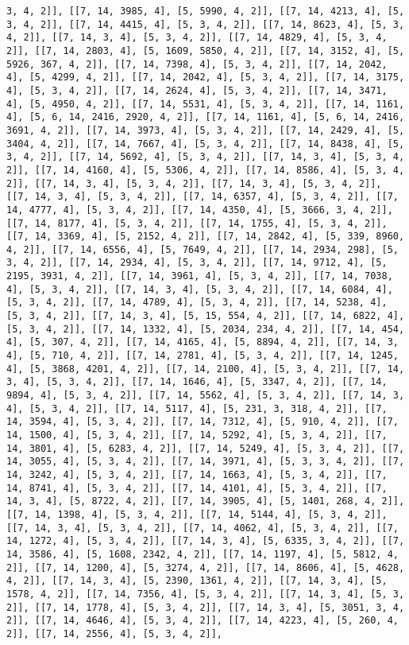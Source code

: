 \documentclass[12pt,fleqn]{article}\usepackage{../../common}
\begin{document}
\begin{verbatim}
3, 4, 2]], [[7, 14, 3985, 4], [5, 5990, 4, 2]], [[7, 14, 4213, 4], [5, 3, 4, 2]], [[7, 14, 4415, 4], [5, 3, 4, 2]], [[7, 14, 8623, 4], [5, 3, 4, 2]], [[7, 14, 3, 4], [5, 3, 4, 2]], [[7, 14, 4829, 4], [5, 3, 4, 2]], [[7, 14, 2803, 4], [5, 1609, 5850, 4, 2]], [[7, 14, 3152, 4], [5, 5926, 367, 4, 2]], [[7, 14, 7398, 4], [5, 3, 4, 2]], [[7, 14, 2042, 4], [5, 4299, 4, 2]], [[7, 14, 2042, 4], [5, 3, 4, 2]], [[7, 14, 3175, 4], [5, 3, 4, 2]], [[7, 14, 2624, 4], [5, 3, 4, 2]], [[7, 14, 3471, 4], [5, 4950, 4, 2]], [[7, 14, 5531, 4], [5, 3, 4, 2]], [[7, 14, 1161, 4], [5, 6, 14, 2416, 2920, 4, 2]], [[7, 14, 1161, 4], [5, 6, 14, 2416, 3691, 4, 2]], [[7, 14, 3973, 4], [5, 3, 4, 2]], [[7, 14, 2429, 4], [5, 3404, 4, 2]], [[7, 14, 7667, 4], [5, 3, 4, 2]], [[7, 14, 8438, 4], [5, 3, 4, 2]], [[7, 14, 5692, 4], [5, 3, 4, 2]], [[7, 14, 3, 4], [5, 3, 4, 2]], [[7, 14, 4160, 4], [5, 5306, 4, 2]], [[7, 14, 8586, 4], [5, 3, 4, 2]], [[7, 14, 3, 4], [5, 3, 4, 2]], [[7, 14, 3, 4], [5, 3, 4, 2]], [[7, 14, 3, 4], [5, 3, 4, 2]], [[7, 14, 6357, 4], [5, 3, 4, 2]], [[7, 14, 4777, 4], [5, 3, 4, 2]], [[7, 14, 4350, 4], [5, 3666, 3, 4, 2]], [[7, 14, 8177, 4], [5, 3, 4, 2]], [[7, 14, 1755, 4], [5, 3, 4, 2]], [[7, 14, 3369, 4], [5, 2152, 4, 2]], [[7, 14, 2842, 4], [5, 339, 8960, 4, 2]], [[7, 14, 6556, 4], [5, 7649, 4, 2]], [[7, 14, 2934, 298], [5, 3, 4, 2]], [[7, 14, 2934, 4], [5, 3, 4, 2]], [[7, 14, 9712, 4], [5, 2195, 3931, 4, 2]], [[7, 14, 3961, 4], [5, 3, 4, 2]], [[7, 14, 7038, 4], [5, 3, 4, 2]], [[7, 14, 3, 4], [5, 3, 4, 2]], [[7, 14, 6084, 4], [5, 3, 4, 2]], [[7, 14, 4789, 4], [5, 3, 4, 2]], [[7, 14, 5238, 4], [5, 3, 4, 2]], [[7, 14, 3, 4], [5, 15, 554, 4, 2]], [[7, 14, 6822, 4], [5, 3, 4, 2]], [[7, 14, 1332, 4], [5, 2034, 234, 4, 2]], [[7, 14, 454, 4], [5, 307, 4, 2]], [[7, 14, 4165, 4], [5, 8894, 4, 2]], [[7, 14, 3, 4], [5, 710, 4, 2]], [[7, 14, 2781, 4], [5, 3, 4, 2]], [[7, 14, 1245, 4], [5, 3868, 4201, 4, 2]], [[7, 14, 2100, 4], [5, 3, 4, 2]], [[7, 14, 3, 4], [5, 3, 4, 2]], [[7, 14, 1646, 4], [5, 3347, 4, 2]], [[7, 14, 9894, 4], [5, 3, 4, 2]], [[7, 14, 5562, 4], [5, 3, 4, 2]], [[7, 14, 3, 4], [5, 3, 4, 2]], [[7, 14, 5117, 4], [5, 231, 3, 318, 4, 2]], [[7, 14, 3594, 4], [5, 3, 4, 2]], [[7, 14, 7312, 4], [5, 910, 4, 2]], [[7, 14, 1500, 4], [5, 3, 4, 2]], [[7, 14, 5292, 4], [5, 3, 4, 2]], [[7, 14, 3801, 4], [5, 6283, 4, 2]], [[7, 14, 5249, 4], [5, 3, 4, 2]], [[7, 14, 3055, 4], [5, 3, 4, 2]], [[7, 14, 3971, 4], [5, 3, 3, 4, 2]], [[7, 14, 3242, 4], [5, 3, 4, 2]], [[7, 14, 1663, 4], [5, 3, 4, 2]], [[7, 14, 8741, 4], [5, 3, 4, 2]], [[7, 14, 4101, 4], [5, 3, 4, 2]], [[7, 14, 3, 4], [5, 8722, 4, 2]], [[7, 14, 3905, 4], [5, 1401, 268, 4, 2]], [[7, 14, 1398, 4], [5, 3, 4, 2]], [[7, 14, 5144, 4], [5, 3, 4, 2]], [[7, 14, 3, 4], [5, 3, 4, 2]], [[7, 14, 4062, 4], [5, 3, 4, 2]], [[7, 14, 1272, 4], [5, 3, 4, 2]], [[7, 14, 3, 4], [5, 6335, 3, 4, 2]], [[7, 14, 3586, 4], [5, 1608, 2342, 4, 2]], [[7, 14, 1197, 4], [5, 5812, 4, 2]], [[7, 14, 1200, 4], [5, 3274, 4, 2]], [[7, 14, 8606, 4], [5, 4628, 4, 2]], [[7, 14, 3, 4], [5, 2390, 1361, 4, 2]], [[7, 14, 3, 4], [5, 1578, 4, 2]], [[7, 14, 7356, 4], [5, 3, 4, 2]], [[7, 14, 3, 4], [5, 3, 2]], [[7, 14, 1778, 4], [5, 3, 4, 2]], [[7, 14, 3, 4], [5, 3051, 3, 4, 2]], [[7, 14, 4646, 4], [5, 3, 4, 2]], [[7, 14, 4223, 4], [5, 260, 4, 2]], [[7, 14, 2556, 4], [5, 3, 4, 2]], 
\end{verbatim}
\end{document}
